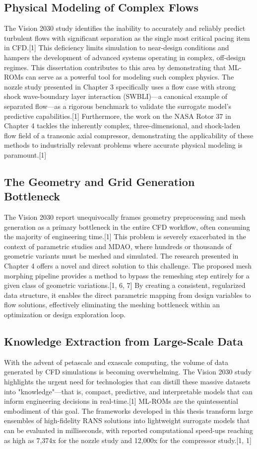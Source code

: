 \documentclass[12pt, a4paper]{report}
\begin{document}
\subsection{Physical Modeling of Complex Flows}
The Vision 2030 study identifies the inability to accurately and reliably predict turbulent flows with significant separation as the single most critical pacing item in CFD.[1] This deficiency limits simulation to near-design conditions and hampers the development of advanced systems operating in complex, off-design regimes. This dissertation contributes to this area by demonstrating that ML-ROMs can serve as a powerful tool for modeling such complex physics. The nozzle study presented in Chapter 3 specifically uses a flow case with strong shock wave-boundary layer interaction (SWBLI)—a canonical example of separated flow—as a rigorous benchmark to validate the surrogate model's predictive capabilities.[1] Furthermore, the work on the NASA Rotor 37 in Chapter 4 tackles the inherently complex, three-dimensional, and shock-laden flow field of a transonic axial compressor, demonstrating the applicability of these methods to industrially relevant problems where accurate physical modeling is paramount.[1]

\subsection{The Geometry and Grid Generation Bottleneck}
The Vision 2030 report unequivocally frames geometry preprocessing and mesh generation as a primary bottleneck in the entire CFD workflow, often consuming the majority of engineering time.[1] This problem is severely exacerbated in the context of parametric studies and MDAO, where hundreds or thousands of geometric variants must be meshed and simulated. The research presented in Chapter 4 offers a novel and direct solution to this challenge. The proposed mesh morphing pipeline provides a method to bypass the remeshing step entirely for a given class of geometric variations.[1, 6, 7] By creating a consistent, regularized data structure, it enables the direct parametric mapping from design variables to flow solutions, effectively eliminating the meshing bottleneck within an optimization or design exploration loop.

\subsection{Knowledge Extraction from Large-Scale Data}
With the advent of petascale and exascale computing, the volume of data generated by CFD simulations is becoming overwhelming. The Vision 2030 study highlights the urgent need for technologies that can distill these massive datasets into "knowledge"—that is, compact, predictive, and interpretable models that can inform engineering decisions in real-time.[1] ML-ROMs are the quintessential embodiment of this goal. The frameworks developed in this thesis transform large ensembles of high-fidelity RANS solutions into lightweight surrogate models that can be evaluated in milliseconds, with reported computational speed-ups reaching as high as 7,374x for the nozzle study and 12,000x for the compressor study.[1, 1]
\end{document}

